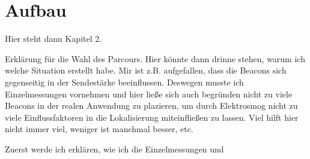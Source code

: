 \chapter{Aufbau}
Hier steht dann Kapitel 2.

Erklärung für die Wahl des Parcours. Hier könnte dann drinne stehen, warum ich welche Situation erstellt habe. Mir ist z.B. aufgefallen, dass die Beacons sich gegenseitig in der Sendestärke beeinflussen. Deswegen musste ich Einzelmessungen vornehmen und hier ließe sich auch begründen nicht zu viele Beacons in der realen Anwendung zu plazieren, um durch Elektrosmog nicht zu viele Einflussfaktoren in die Lokalisierung miteinfließen zu lassen. Viel hilft hier nicht immer viel, weniger ist manchmal besser, etc.

Zuerst werde ich erklären, wie ich die Einzelmessungen und 